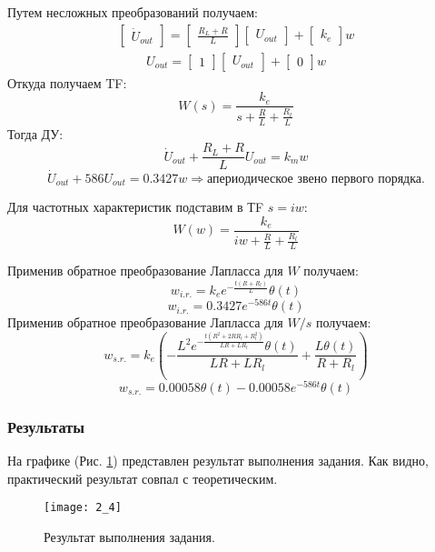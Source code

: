 \documentclass[16pt]{article}
\begin{document}
Путем несложных преобразований получаем:
\begin{align}
    \begin{bmatrix}
        \dot{U}_{out}
    \end{bmatrix}
    = 
    \begin{bmatrix}
        \frac{R_L + R}{L}
    \end{bmatrix}
    \begin{bmatrix}
        U_{out}
    \end{bmatrix}
    + 
    \begin{bmatrix}
        k_e
    \end{bmatrix}
    w
\end{align}
\begin{align}
    U_{out} 
    = 
    \begin{bmatrix}
        1
    \end{bmatrix}
    \begin{bmatrix}
        U_{out}
    \end{bmatrix}
    + 
    \begin{bmatrix}
        0
    \end{bmatrix}
    w
\end{align}
Откуда получаем TF:
\[
    W(s) = \frac{k_{e}}{s + \frac{R}{L} + \frac{R_{l}}{L}}
\]
Тогда ДУ:
\[
    \dot{U}_{out} + \frac{R_L + R}{L}U_{out} = k_mw
\]
\[
    \dot{U}_{out} + 586U_{out} = 0.3427w \Rightarrow \text{апериодическое звено первого порядка}.
\]

Для частотных характеристик подставим в ТF \(s = iw\):
\[
    W(w) = \frac{k_{e}}{iw + \frac{R}{L} + \frac{R_{l}}{L}}
\]

Применив обратное преобразование Лапласса для \(W\) получаем:
\[w_{i.r.} = k_{e} e^{- \frac{t \left(R + R_{l}\right)}{L}} \theta\left(t\right)\]
\[w_{i.r.} = 0.3427 e^{- 586 t} \theta\left(t\right)\]
Применив обратное преобразование Лапласса для \(W / s\) получаем:
\[w_{s.r.} = k_{e} \left(- \frac{L^{2} e^{- \frac{t \left(R^{2} + 2 R R_{l} + R_{l}^{2}\right)}{L R + L R_{l}}} \theta\left(t\right)}{L R + L R_{l}} + \frac{L \theta\left(t\right)}{R + R_{l}}\right)\]
\[w_{s.r.} = 0.00058 \theta\left(t\right) - 0.00058 e^{- 586 t} \theta\left(t\right)\]
\subsubsection{Результаты}
На графике (Рис. \ref*{fig:fig4}) представлен результат выполнения задания. Как видно, практический результат совпал с теоретическим.
\begin{figure}[h!]
    \centering
    \texttt{[image: 2\_4]}
    \caption{Результат выполнения задания.}
    \label{fig:fig4}
\end{figure}
\end{document}
